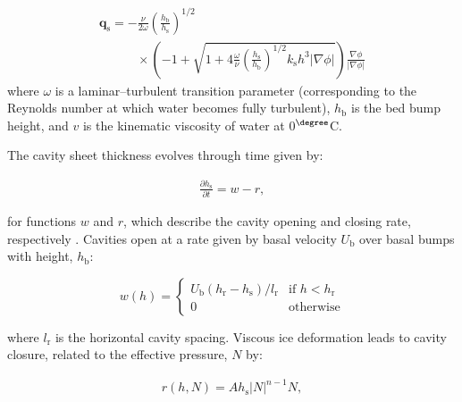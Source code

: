 \documentclass[tc, manuscript]{copernicus}
\begin{document}
\begin{equation}
\label{appeqn: Transition}
\begin{aligned}
\mathbf{q}_{\mathrm{s}} = -\frac{\nu}{2 \omega} \left(\frac{h_{\mathrm{b}}}{h_{\mathrm{s}}}\right)^{1 / 2} \hspace{10em}\\
\hspace{3em} \times \left(-1 + \sqrt{1 + 4 \frac{\omega}{\nu} \left(\frac{h_{\mathrm{s}}}{h_{\mathrm{b}}}\right)^{1 / 2} k_{\mathrm{s}} h^3 |\nabla \phi|} \right) \frac{\nabla \phi}{|\nabla \phi|}
\end{aligned}
\end{equation}
where $\omega$ is a laminar--turbulent transition parameter (corresponding to the Reynolds number at which water becomes fully turbulent), $h_{\mathrm{b}}$ is the bed bump height, and $v$ is the kinematic viscosity of water at 0$^{\degree}$C. 

The cavity sheet thickness evolves through time given by:

\begin{equation}
\label{appeqn: hs_cav}
\begin{aligned}
\frac{\partial h_{\mathrm{s}}}{\partial t} = w - r,
\end{aligned}
\end{equation}

for functions $w$ and $r$, which describe the cavity opening and closing rate, respectively \citep{kamb1987glacier,walder1994channelized}. Cavities open at a rate given by basal velocity $U_{\mathrm{b}}$ over basal bumps with height, $h_{\mathrm{b}}$:

\begin{equation}
\label{appeqn: basal sliding}
w(h) = 
	\begin{cases}
	U_{\mathrm{b}}({h_{\mathrm{r}} - h_{\mathrm{s}}})/{l_{\mathrm{r}}} & \text{if } h < h_{\mathrm{r}} \\
	0 & \text{otherwise}
	\end{cases}
\end{equation}

where $l_{\mathrm{r}}$ is the horizontal cavity spacing. Viscous ice deformation leads to cavity closure, related to the effective pressure, $N$ by:

\begin{equation}
\label{appeqn: viscous closure}
\begin{aligned}
r(h,N) = Ah_{\mathrm{s}}|N|^{n-1}N, 
\end{aligned}
\end{equation}
\end{document}
